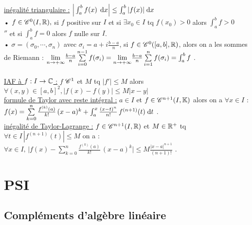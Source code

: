 \documentclass[12 pt]{book}
\begin{document}
\begin{flushleft}
\begin{doublespace}

	\underline{inégalité triangulaire :}  $\Big| \int_a^b f(x) \, \; \text{d}x \Big| \leq \int_a^b | f(x) | \; \text{d}x$\\
	• $f\in \mathscr{C}^0 (I,\mathbb{R}),$ si $f$ positive sur $I$ et si $\exists x_0\in I$ tq $f(x_0)>0$ alors $\int_a^b f >0$\\
	\qquad \quad $''$ \qquad et si $\int_a^b f = 0$ alors $f$ nulle sur $I$.\\
	
	• $\sigma = (\sigma_0,\cdots,\sigma_n)$ avec $\sigma_i = a + i\frac{b - a}{n}$, si $f\in \mathscr{C}^0([a,b],\mathbb{R})$, alors on a les sommes de Riemann : $\underset{n \rightarrow +\infty}{\text{lim}} \frac{b-a}{n} \sum\limits_{i = 0}^{n-1} f(\sigma_i) = \underset{n \rightarrow +			\infty}{\text{lim}} \frac{b-a}{n} \sum\limits_{i =1}^n f(\sigma_i) = \int_a^b f$ .\\
	
	\text{ }\\
	\underline{IAF à $f : I\rightarrow \mathbb{C}$ :} $f$ $\mathscr{C}^1$ et $M$ tq $|f'|\leq M$ alors $\forall (x,y)\in[a,b]^2, |f(x) - f(y)| \leq M |x - y|$\\
	\underline{formule de Taylor avec reste intégral :} $a\in I$ et $f\in \mathscr{C}^{n+1}(I,\mathbb{K})$ alors on a $\forall x\in I$ :\\
	$f(x) = \sum\limits_{k = 0}^n \frac{f^{(k)} (a)}{k!} \, (x-a)^k + \int_a^x \frac{(x-t)^n}{n!} \, f^{(n+1)} (t) \; \text{d}t$ .\\
	\underline{inégalité de Taylor-Lagrange :} $f\in\mathscr{C}^{n+1}(I,\mathbb{R})$ et $M\in\mathbb{R}^+$ tq $\forall t\in I \,|f^{(n+1)}(t) | \leq M$ on a :\\
	$\forall x\in I, \, \Big| f(x) - \sum\limits_{k=0}^n \frac{f^{(k)} (a)}{k!} \, (x-a)^k \Big| \leq M\frac{| x - a|^{n+1}}{(n+1)!}$ .\\

\end{doublespace}
\end{flushleft}

\chapter*{PSI}

\section*{Compléments d'algèbre linéaire}
\end{document}

